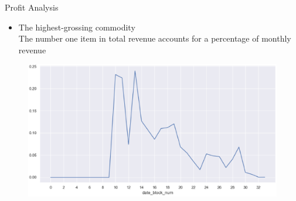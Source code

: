 \documentclass[
 size=14pt,
 paper=smartboard,  %
 mode=present, 		%
 display=slides, 	%
 style=tuliplab,  	%
 pauseslide,
 fleqn,leqno]{powerdot}
\begin{document}
\begin{slide}{Profit  Analysis}
  \begin{itemize}
    \item The highest-grossing commodity\\
    The number one item in total revenue accounts for a percentage of monthly revenue
  \end{itemize}
  
  \begin{figure}[htbp]
    \centering
    \begin{minipage}[t]{0.28\textwidth}
      \centering
      \centerline{\includegraphics[width=3\textwidth]{logos/highcom.eps}}
      \vspace{-1.0em}
    \end{minipage}
  \end{figure}
\end{slide}

\end{document}
